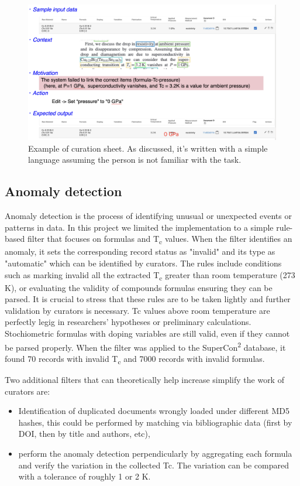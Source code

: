 \documentclass[a4paper]{article}
\begin{document}
\begin{figure}[ht]
  \centering
  \includegraphics[width=1\textwidth]{images/example-sheet-curation.png} 
  \caption{Example of curation sheet. As discussed, it's written with a simple language assuming the person is not familiar with the task. }
  \label{fig:example-curation-sheet}
\end{figure}

\subsection{Anomaly detection}
\label{subsec:anomaly-detection}
Anomaly detection is the process of identifying unusual or unexpected events or patterns in data. In this project we limited the implementation to a simple rule-based filter that focuses on formulas and T\textsubscript{c} values.
When the filter identifies an anomaly, it sets the corresponding record status as "invalid" and its type as "automatic" which can be identified by curators. 
The rules include conditions such as marking invalid all the extracted T\textsubscript{c} greater than room temperature (273 K), or evaluating the validity of compounds formulas ensuring they can be parsed. 
It is crucial to stress that these rules are to be taken lightly and further validation by curators is necessary. Tc values above room temperature are perfectly legig in researchers' hypotheses or preliminary calculations. Stochiometric formulas with doping variables are still valid, even if they cannot be parsed properly. 
When the filter was applied to the SuperCon\textsuperscript{2} database, it found 70 records with invalid T\textsubscript{c} and 7000 records with invalid formulas. 

Two additional filters that can theoretically help increase simplify the work of curators are: 
\begin{itemize}
    \item Identification of duplicated documents wrongly loaded under different MD5 hashes, this could be performed by matching via bibliographic data (first by DOI, then by title and authors, etc), 
    \item perform the anomaly detection perpendicularly by aggregating each formula and verify the variation in the collected Tc. The variation can be compared with a tolerance of roughly 1 or 2 K. 
\end{itemize}
\end{document}

